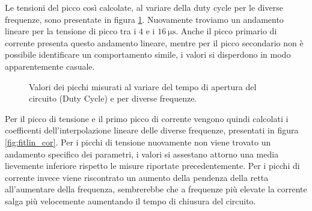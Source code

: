 Le tensioni del picco così calcolate, al variare della duty cycle per le diverse frequenze, sono presentate in figura \ref{fig:picchi}.
Nuovamente troviamo un andamento lineare per la tensione di picco tra i $\num{4}$ e i $\SI{16}{\micro\second}$. Anche il picco primario di corrente presenta questo andamento lineare, mentre per il picco secondario non è possibile identificare un comportamento simile, i valori si disperdono in modo apparentemente casuale.

\begin{figure}
\centering
{}
\newline
{}
\caption{Valori dei picchi misurati al variare del tempo di apertura del circuito (Duty Cycle) e per diverse frequenze.}
\label{fig:picchi}
\end{figure}


Per il picco di tensione e il primo picco di corrente vengono quindi calcolati i coefficenti dell'interpolazione lineare delle diverse frequenze, presentati in figura \ref{fig:fitlin_cor}. 
Per i picchi di tensione nuovamente non viene trovato un andamento specifico dei parametri, i valori si assestano attorno una media lievemente inferiore rispetto le misure riportate precedentemente.
Per i picchi di corrente invece viene riscontrato un aumento della pendenza della retta all'aumentare della frequenza, sembrerebbe che a frequenze più elevate la corrente salga più velocemente aumentando il tempo di chiusura del circuito.

